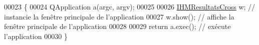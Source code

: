 \begin{DoxyCode}
00023 \{
00024     QApplication a(argc, argv);
00025 
00026     \hyperlink{class_i_h_m_resultats_cross}{IHMResultatsCross} w; \textcolor{comment}{// instancie la fenêtre principale de l'application}
00027     w.show(); \textcolor{comment}{// affiche la fenêtre principale de l'application}
00028 
00029     \textcolor{keywordflow}{return} a.exec(); \textcolor{comment}{// exécute l'application}
00030 \}
\end{DoxyCode}
